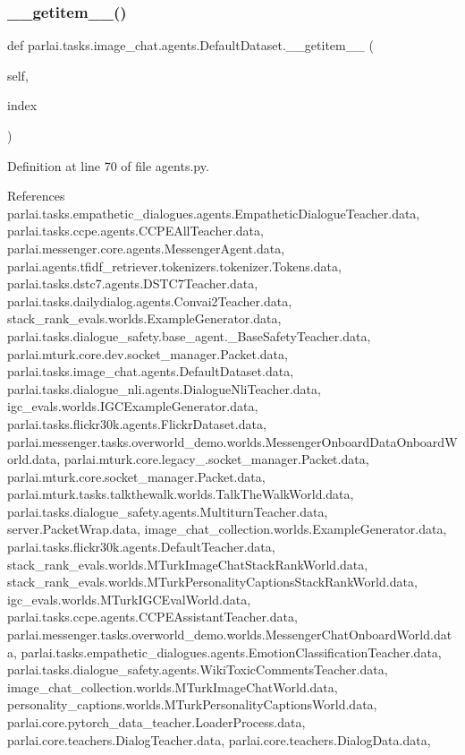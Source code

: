 \subsubsection{\texorpdfstring{\+\_\+\+\_\+getitem\+\_\+\+\_\+()}{\_\_getitem\_\_()}}
{\footnotesize\ttfamily def parlai.\+tasks.\+image\+\_\+chat.\+agents.\+Default\+Dataset.\+\_\+\+\_\+getitem\+\_\+\+\_\+ (\begin{DoxyParamCaption}\item[{}]{self,  }\item[{}]{index }\end{DoxyParamCaption})}



Definition at line 70 of file agents.\+py.



References parlai.\+tasks.\+empathetic\+\_\+dialogues.\+agents.\+Empathetic\+Dialogue\+Teacher.\+data, parlai.\+tasks.\+ccpe.\+agents.\+C\+C\+P\+E\+All\+Teacher.\+data, parlai.\+messenger.\+core.\+agents.\+Messenger\+Agent.\+data, parlai.\+agents.\+tfidf\+\_\+retriever.\+tokenizers.\+tokenizer.\+Tokens.\+data, parlai.\+tasks.\+dstc7.\+agents.\+D\+S\+T\+C7\+Teacher.\+data, parlai.\+tasks.\+dailydialog.\+agents.\+Convai2\+Teacher.\+data, stack\+\_\+rank\+\_\+evals.\+worlds.\+Example\+Generator.\+data, parlai.\+tasks.\+dialogue\+\_\+safety.\+base\+\_\+agent.\+\_\+\+Base\+Safety\+Teacher.\+data, parlai.\+mturk.\+core.\+dev.\+socket\+\_\+manager.\+Packet.\+data, parlai.\+tasks.\+image\+\_\+chat.\+agents.\+Default\+Dataset.\+data, parlai.\+tasks.\+dialogue\+\_\+nli.\+agents.\+Dialogue\+Nli\+Teacher.\+data, igc\+\_\+evals.\+worlds.\+I\+G\+C\+Example\+Generator.\+data, parlai.\+tasks.\+flickr30k.\+agents.\+Flickr\+Dataset.\+data, parlai.\+messenger.\+tasks.\+overworld\+\_\+demo.\+worlds.\+Messenger\+Onboard\+Data\+Onboard\+World.\+data, parlai.\+mturk.\+core.\+legacy\+\_.\+socket\+\_\+manager.\+Packet.\+data, parlai.\+mturk.\+core.\+socket\+\_\+manager.\+Packet.\+data, parlai.\+mturk.\+tasks.\+talkthewalk.\+worlds.\+Talk\+The\+Walk\+World.\+data, parlai.\+tasks.\+dialogue\+\_\+safety.\+agents.\+Multiturn\+Teacher.\+data, server.\+Packet\+Wrap.\+data, image\+\_\+chat\+\_\+collection.\+worlds.\+Example\+Generator.\+data, parlai.\+tasks.\+flickr30k.\+agents.\+Default\+Teacher.\+data, stack\+\_\+rank\+\_\+evals.\+worlds.\+M\+Turk\+Image\+Chat\+Stack\+Rank\+World.\+data, stack\+\_\+rank\+\_\+evals.\+worlds.\+M\+Turk\+Personality\+Captions\+Stack\+Rank\+World.\+data, igc\+\_\+evals.\+worlds.\+M\+Turk\+I\+G\+C\+Eval\+World.\+data, parlai.\+tasks.\+ccpe.\+agents.\+C\+C\+P\+E\+Assistant\+Teacher.\+data, parlai.\+messenger.\+tasks.\+overworld\+\_\+demo.\+worlds.\+Messenger\+Chat\+Onboard\+World.\+data, parlai.\+tasks.\+empathetic\+\_\+dialogues.\+agents.\+Emotion\+Classification\+Teacher.\+data, parlai.\+tasks.\+dialogue\+\_\+safety.\+agents.\+Wiki\+Toxic\+Comments\+Teacher.\+data, image\+\_\+chat\+\_\+collection.\+worlds.\+M\+Turk\+Image\+Chat\+World.\+data, personality\+\_\+captions.\+worlds.\+M\+Turk\+Personality\+Captions\+World.\+data, parlai.\+core.\+pytorch\+\_\+data\+\_\+teacher.\+Loader\+Process.\+data, parlai.\+core.\+teachers.\+Dialog\+Teacher.\+data, parlai.\+core.\+teachers.\+Dialog\+Data.\+data, 